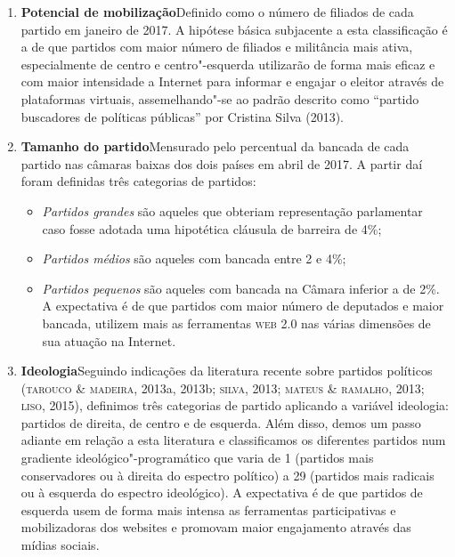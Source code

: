 \begin{enumerate}
\item\textbf{Potencial de mobilização}\quad Definido como o número de
filiados de cada partido em janeiro de 2017. A hipótese básica
subjacente a esta classificação é a de que partidos com maior número de
filiados e militância mais ativa, especialmente de centro e
centro"-esquerda utilizarão de forma mais eficaz e com maior intensidade
a Internet para informar e engajar o eleitor através de plataformas
virtuais, assemelhando"-se ao padrão descrito como ``partido buscadores
de políticas públicas'' por Cristina Silva (2013).

\item\textbf{Tamanho do partido}\quad Mensurado pelo percentual da
bancada de cada partido nas câmaras baixas dos dois países em abril de
2017. A partir daí foram definidas três categorias de partidos: 

\begin{itemize}
\item \textit{Partidos grandes} são aqueles que obteriam representação parlamentar
caso fosse adotada uma hipotética cláusula de barreira de 4\%; 

\item \textit{Partidos médios} são aqueles com bancada entre 2 e 4\%; 

\item \textit{Partidos pequenos} são aqueles com bancada na Câmara inferior a de
2\%. A expectativa é de que partidos com maior número de deputados e
maior bancada, utilizem mais as ferramentas \textsc{web 2.0} nas várias dimensões
de sua atuação na Internet.
\end{itemize}

\item\textbf{Ideologia}\quad Seguindo indicações da literatura
recente sobre partidos políticos (\textsc{tarouco \& madeira}, 2013a, 2013b;
\textsc{silva}, 2013; \textsc{mateus \& ramalho}, 2013; \textsc{liso}, 2015), definimos três
categorias de partido aplicando a variável ideologia: partidos de
direita, de centro e de esquerda. Além disso, demos um passo adiante em
relação a esta literatura e classificamos os diferentes partidos num
gradiente ideológico"-programático que varia de 1 (partidos mais
conservadores ou à direita do espectro político) a 29 (partidos mais
radicais ou à esquerda do espectro ideológico). A expectativa é de que
partidos de esquerda usem de forma mais intensa as ferramentas
participativas e mobilizadoras dos websites e promovam maior engajamento
através das mídias sociais.


\end{enumerate}

